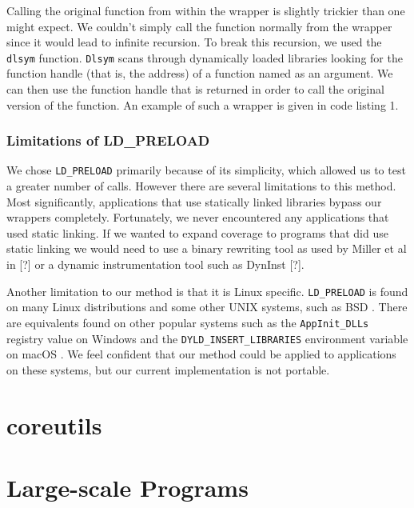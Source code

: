 \documentclass[10pt]{article}
\begin{document}
Calling the original function from within the wrapper is slightly trickier than one might expect. We couldn't simply call the function normally from the wrapper since it would lead to infinite recursion. To break this recursion, we used the \texttt{dlsym} function. \texttt{Dlsym} scans through dynamically loaded libraries looking for the function handle (that is, the address) of a function named as an argument. We can then use the function handle that is returned in order to call the original version of the function. An example of such a wrapper is given in code listing 1.

\begin{minipage}{\linewidth} %
	
\end{minipage}

\subsubsection{Limitations of LD\_PRELOAD}
We chose \texttt{LD\_PRELOAD} primarily because of its simplicity, which allowed us to test a greater number of calls. However there are several limitations to this method. Most significantly, applications that use statically linked libraries bypass our wrappers completely. Fortunately, we never encountered any applications that used static linking. If we wanted to expand coverage to programs that did use static linking we would need to use a binary rewriting tool as used by Miller et al in [?] or a dynamic instrumentation tool such as DynInst [?].

Another limitation to our method is that it is Linux specific. \texttt{LD\_PRELOAD} is found on many Linux distributions and some other UNIX systems, such as BSD \cite{bsd}. There are equivalents found on other popular systems such as the \texttt{AppInit\_DLLs} registry value on Windows \cite{dll} and the \texttt{DYLD\_INSERT\_LIBRARIES} environment variable on macOS \cite{macos}. We feel confident that our method could be applied to applications on these systems, but our current implementation is not portable.

\section{coreutils}

\section{Large-scale Programs}

\end{document}
